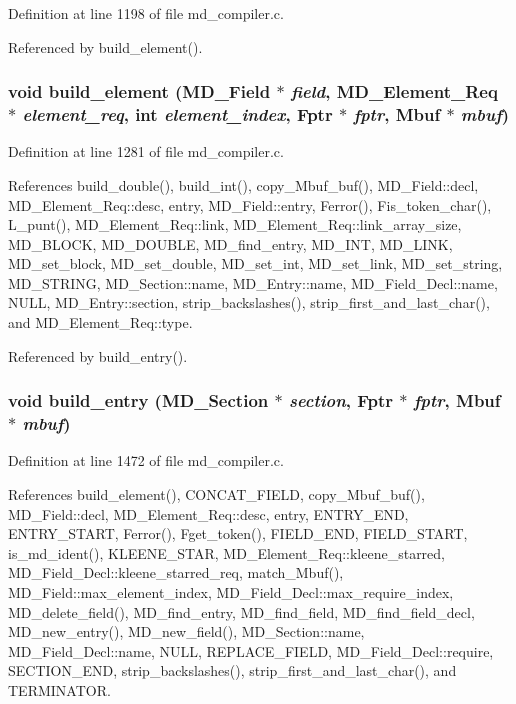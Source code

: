 Definition at line 1198 of file md\_\-compiler.c.

Referenced by build\_\-element().
\subsubsection{\setlength{\rightskip}{0pt plus 5cm}void build\_\-element (\bf{MD\_\-Field} $\ast$ {\em field}, \bf{MD\_\-Element\_\-Req} $\ast$ {\em element\_\-req}, int {\em element\_\-index}, \bf{Fptr} $\ast$ {\em fptr}, \bf{Mbuf} $\ast$ {\em mbuf})}\label{md__compiler_8c_de61fda8263e72bad493eade04a924c8}




Definition at line 1281 of file md\_\-compiler.c.

References build\_\-double(), build\_\-int(), copy\_\-Mbuf\_\-buf(), MD\_\-Field::decl, MD\_\-Element\_\-Req::desc, entry, MD\_\-Field::entry, Ferror(), Fis\_\-token\_\-char(), L\_\-punt(), MD\_\-Element\_\-Req::link, MD\_\-Element\_\-Req::link\_\-array\_\-size, MD\_\-BLOCK, MD\_\-DOUBLE, MD\_\-find\_\-entry, MD\_\-INT, MD\_\-LINK, MD\_\-set\_\-block, MD\_\-set\_\-double, MD\_\-set\_\-int, MD\_\-set\_\-link, MD\_\-set\_\-string, MD\_\-STRING, MD\_\-Section::name, MD\_\-Entry::name, MD\_\-Field\_\-Decl::name, NULL, MD\_\-Entry::section, strip\_\-backslashes(), strip\_\-first\_\-and\_\-last\_\-char(), and MD\_\-Element\_\-Req::type.

Referenced by build\_\-entry().
\subsubsection{\setlength{\rightskip}{0pt plus 5cm}void build\_\-entry (\bf{MD\_\-Section} $\ast$ {\em section}, \bf{Fptr} $\ast$ {\em fptr}, \bf{Mbuf} $\ast$ {\em mbuf})}\label{md__compiler_8c_4a74b90f11f6771e28a937a67442c253}




Definition at line 1472 of file md\_\-compiler.c.

References build\_\-element(), CONCAT\_\-FIELD, copy\_\-Mbuf\_\-buf(), MD\_\-Field::decl, MD\_\-Element\_\-Req::desc, entry, ENTRY\_\-END, ENTRY\_\-START, Ferror(), Fget\_\-token(), FIELD\_\-END, FIELD\_\-START, is\_\-md\_\-ident(), KLEENE\_\-STAR, MD\_\-Element\_\-Req::kleene\_\-starred, MD\_\-Field\_\-Decl::kleene\_\-starred\_\-req, match\_\-Mbuf(), MD\_\-Field::max\_\-element\_\-index, MD\_\-Field\_\-Decl::max\_\-require\_\-index, MD\_\-delete\_\-field(), MD\_\-find\_\-entry, MD\_\-find\_\-field, MD\_\-find\_\-field\_\-decl, MD\_\-new\_\-entry(), MD\_\-new\_\-field(), MD\_\-Section::name, MD\_\-Field\_\-Decl::name, NULL, REPLACE\_\-FIELD, MD\_\-Field\_\-Decl::require, SECTION\_\-END, strip\_\-backslashes(), strip\_\-first\_\-and\_\-last\_\-char(), and TERMINATOR.


